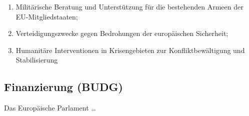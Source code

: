\documentclass[12pt,a4paper]{article}
\begin{document}
\begin{enumerate}[leftmargin=2em, itemsep=10pt]
\begin{enumerate}[label=\alph*), leftmargin=1.5em, itemsep=6pt]
        \item Militärische Beratung und Unterstützung für die bestehenden Armeen der EU-Mitgliedstaaten;

        \item Verteidigungszwecke gegen Bedrohungen der europäischen Sicherheit;

        \item Humanitäre Interventionen in Krisengebieten zur Konfliktbewältigung und Stabilisierung
    \end{enumerate}
\end{enumerate}

\subsection*{Finanzierung (BUDG)}

\noindent Das Europäische Parlament \ldots
\end{document}
